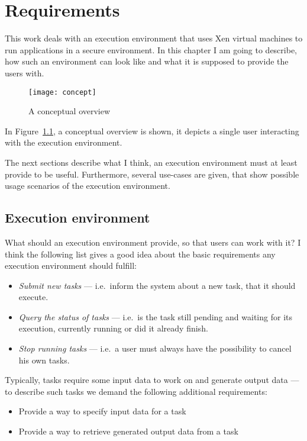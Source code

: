 \chapter{Requirements}
\label{cha:requirements}

This  work deals  with  an  execution environment  that  uses Xen  virtual
machines to run  applications in a secure environment.   In this chapter I
am going to describe, how such an environment can look like and what it is
supposed to provide the users with.

\begin{figure}[htbp]
  \begin{center}
    \texttt{[image: concept]}
  \end{center}
  \caption[Conceptual overview]{A conceptual overview}
  \label{fig:concept}
\end{figure}

In Figure~\ref{fig:concept},  a conceptual overview  is shown, it  depicts a
single user interacting with the execution environment.

The next sections describe what  I think, an execution environment must at
least provide to be useful. Furthermore, several use-cases are given, that
show possible usage scenarios of the execution environment.

\section{Execution environment}
\label{sec:req-execution-environment}

What should an execution environment  provide, so that users can work with
it?  I  think  the following  list  gives  a  good  idea about  the  basic
requirements any execution environment should fulfill:

\begin{itemize}
\item \emph{Submit new tasks} --- i.e.~inform the system about a new task,
  that it should execute.
\item \emph{Query the status of  tasks} --- i.e.~is the task still pending
  and  waiting for  its execution,  currently  running or  did it  already
  finish.
\item \emph{Stop running tasks} --- i.e.~a user must always have the
  possibility to cancel his own tasks.
\end{itemize}

Typically, tasks  require some input data  to work on  and generate output
data  ---  to describe  such  tasks  we  demand the  following  additional
requirements:
\begin{itemize}
\item Provide a way to specify input data for a task
\item Provide a way to retrieve generated output data from a task
\end{itemize}

